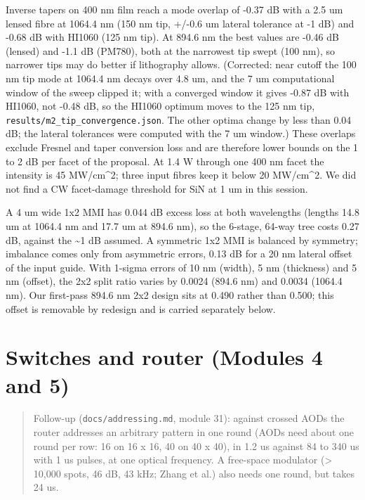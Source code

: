 Inverse tapers on 400 nm film reach a mode overlap of -0.37 dB with a
2.5 um lensed fibre at 1064.4 nm (150 nm tip, +/-0.6 um lateral
tolerance at -1 dB) and -0.68 dB with HI1060 (125 nm tip). At 894.6 nm
the best values are -0.46 dB (lensed) and -1.1 dB (PM780), both at the
narrowest tip swept (100 nm), so narrower tips may do better if
lithography allows. (Corrected: near cutoff the 100 nm tip mode at
1064.4 nm decays over 4.8 um, and the 7 um computational window of the
sweep clipped it; with a converged window it gives -0.87 dB with HI1060,
not -0.48 dB, so the HI1060 optimum moves to the 125 nm tip,
\texttt{results/m2\_tip\_convergence.json}. The other optima change by
less than 0.04 dB; the lateral tolerances were computed with the 7 um
window.) These overlaps exclude Fresnel and taper conversion loss and
are therefore lower bounds on the 1 to 2 dB per facet of the proposal.
At 1.4 W through one 400 nm facet the intensity is 45 MW/cm\^{}2; three
input fibres keep it below 20 MW/cm\^{}2. We did not find a CW
facet-damage threshold for SiN at 1 um in this session.

A 4 um wide 1x2 MMI has 0.044 dB excess loss at both wavelengths
(lengths 14.8 um at 1064.4 nm and 17.7 um at 894.6 nm), so the 6-stage,
64-way tree costs 0.27 dB, against the \textasciitilde1 dB assumed. A
symmetric 1x2 MMI is balanced by symmetry; imbalance comes only from
asymmetric errors, 0.13 dB for a 20 nm lateral offset of the input
guide. With 1-sigma errors of 10 nm (width), 5 nm (thickness) and 5 nm
(offset), the 2x2 split ratio varies by 0.0024 (894.6 nm) and 0.0034
(1064.4 nm). Our first-pass 894.6 nm 2x2 design sits at 0.490 rather
than 0.500; this offset is removable by redesign and is carried
separately below.

\hypertarget{5-switches-and-router-modules-4-and-5}{%
\section{Switches and router (Modules 4 and
5)}\label{findings-5-switches-and-router-modules-4-and-5}}

\begin{quote}
Follow-up (\texttt{docs/addressing.md}, module 31): against crossed AODs
the router addresses an arbitrary pattern in one round (AODs need about
one round per row: 16 on 16 x 16, 40 on 40 x 40), in 1.2 us against 84
to 340 us with 1 us pulses, at one optical frequency. A free-space
modulator (\textgreater{} 10,000 spots, 46 dB, 43 kHz; Zhang et al.)
also needs one round, but takes 24 us.
\end{quote}

